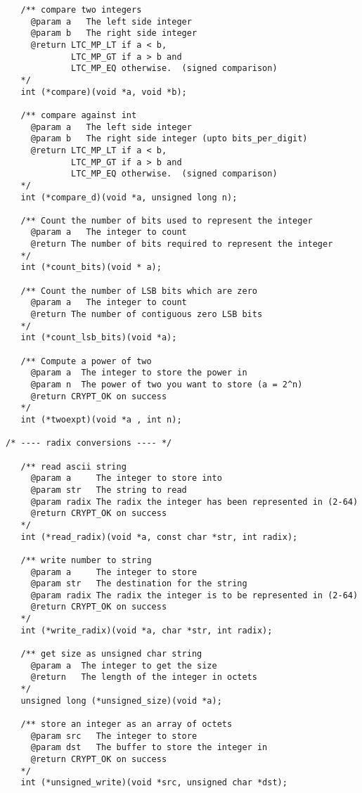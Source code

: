 \documentclass[synpaper]{book}
\begin{document}
\begin{small}
\begin{verbatim}
   /** compare two integers
     @param a   The left side integer
     @param b   The right side integer
     @return LTC_MP_LT if a < b, 
             LTC_MP_GT if a > b and 
             LTC_MP_EQ otherwise.  (signed comparison)
   */
   int (*compare)(void *a, void *b);

   /** compare against int 
     @param a   The left side integer
     @param b   The right side integer (upto bits_per_digit)
     @return LTC_MP_LT if a < b, 
             LTC_MP_GT if a > b and 
             LTC_MP_EQ otherwise.  (signed comparison)
   */
   int (*compare_d)(void *a, unsigned long n);

   /** Count the number of bits used to represent the integer
     @param a   The integer to count
     @return The number of bits required to represent the integer
   */
   int (*count_bits)(void * a);

   /** Count the number of LSB bits which are zero 
     @param a   The integer to count
     @return The number of contiguous zero LSB bits
   */
   int (*count_lsb_bits)(void *a);

   /** Compute a power of two
     @param a  The integer to store the power in
     @param n  The power of two you want to store (a = 2^n)
     @return CRYPT_OK on success
   */
   int (*twoexpt)(void *a , int n);

/* ---- radix conversions ---- */
   
   /** read ascii string 
     @param a     The integer to store into
     @param str   The string to read
     @param radix The radix the integer has been represented in (2-64)
     @return CRYPT_OK on success
   */
   int (*read_radix)(void *a, const char *str, int radix);

   /** write number to string
     @param a     The integer to store
     @param str   The destination for the string
     @param radix The radix the integer is to be represented in (2-64)
     @return CRYPT_OK on success
   */
   int (*write_radix)(void *a, char *str, int radix);

   /** get size as unsigned char string 
     @param a  The integer to get the size
     @return   The length of the integer in octets
   */
   unsigned long (*unsigned_size)(void *a);

   /** store an integer as an array of octets 
     @param src   The integer to store
     @param dst   The buffer to store the integer in
     @return CRYPT_OK on success
   */
   int (*unsigned_write)(void *src, unsigned char *dst);


\end{verbatim}
\end{small}
\end{document}
